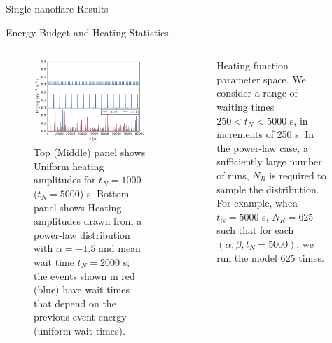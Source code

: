 \documentclass[final]{beamer}
\begin{document}
\begin{frame}
\begin{columns}[t]
\begin{column}{0.49\linewidth}
\begin{block}{Single-nanoflare Results}
\begin{figure}
      \end{figure}
      \vspace{-2ex}
    \end{block}
    \begin{block}{Energy Budget and Heating Statistics}
      \begin{columns}[T]
      \begin{column}{0.49\columnwidth}
        \vspace{-2ex}
        \begin{figure}
          \includegraphics[width=\columnwidth]{figures/heating_functions.pdf}
          \caption{Top (Middle) panel shows Uniform heating amplitudes for $t_N=1000$ ($t_N=5000$) s. Bottom panel shows Heating amplitudes drawn from a power-law distribution with  $\alpha=-1.5$ and mean wait time $t_N=2000$ s; the events shown in red (blue) have wait times that depend on the previous event energy (uniform wait times).}
          \label{fig:heating_funcs}
        \end{figure}
      \end{column}
      \begin{column}{0.49\columnwidth}
        \vspace{-6ex}
        \begin{figure}
          \centering
          
          \caption{Heating function parameter space. We consider a range of waiting times $250<t_N<5000$ s, in increments of 250 s. In the power-law case, a sufficiently large number of runs, $N_R$ is required to sample the distribution. For example, when $t_N=5000$ s, $N_R=625$ such that for each $(\alpha,\beta,t_N=5000)$, we run the model 625 times.}

\end{figure}
\end{column}
\end{columns}
\end{block}
\end{column}
\end{columns}
\end{frame}
\end{document}
